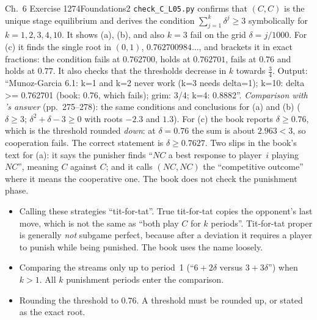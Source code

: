 \begin{exsol}{\MG{} Ch.~6 Exercise 1}{274}{Foundations}{2}
\verify \texttt{check\_C\_L05.py} confirms that $(C,C)$ is the unique stage equilibrium and derives
the condition $\sum_{j=1}^k\delta^j \ge 3$ symbolically for $k = 1, 2, 3, 4, 10$. It shows (a), (b),
and also $k = 3$ fail on the grid $\delta = j/1000$. For (c) it finds the single root in $(0,1)$,
$0.762700984\ldots$, and brackets it in exact fractions: the condition fails at $0.762700$, holds at
$0.762701$, fails at $0.76$ and holds at $0.77$. It also checks that the thresholds decrease in $k$
towards $\frac34$. Output: ``Munoz-Garcia 6.1: k=1 and k=2 never work (k=3 needs delta=1); k=10:
delta >= 0.762701 (book: 0.76, which fails); grim: 3/4; k=4: 0.8882''.
\emph{Comparison with \MG{}'s answer} (pp.~275--278): the same conditions and conclusions for (a)
and (b) ($\delta \ge 3$; $\delta^2 + \delta - 3 \ge 0$ with roots $-2.3$ and $1.3$). For (c) the book
reports $\delta \ge 0.76$, which is the threshold rounded \emph{down}: at $\delta = 0.76$ the sum is
about $2.963 < 3$, so cooperation fails. The correct statement is $\delta \ge 0.7627$. Two slips in
the book's text for (a): it says the punisher finds ``$NC$ a best response to player~$i$ playing
$NC$'', meaning $C$ against $C$; and it calls $(NC,NC)$ the ``competitive outcome'' where it means the
cooperative one. The book does not check the punishment phase.

\mistakes
\begin{itemize}
  \item Calling these strategies ``tit-for-tat''. True tit-for-tat copies the opponent's last move,
  which is not the same as ``both play $C$ for $k$ periods''. Tit-for-tat proper is generally
  \emph{not} subgame perfect, because after a deviation it requires a player to punish while being
  punished. The book uses the name loosely.
  \item Comparing the streams only up to period~1 (``$6 + 2\delta$ versus $3 + 3\delta$'') when
  $k > 1$. All $k$ punishment periods enter the comparison.
  \item Rounding the threshold to $0.76$. A threshold must be rounded up, or stated as the exact
  root.
\end{itemize}

\end{exsol}
